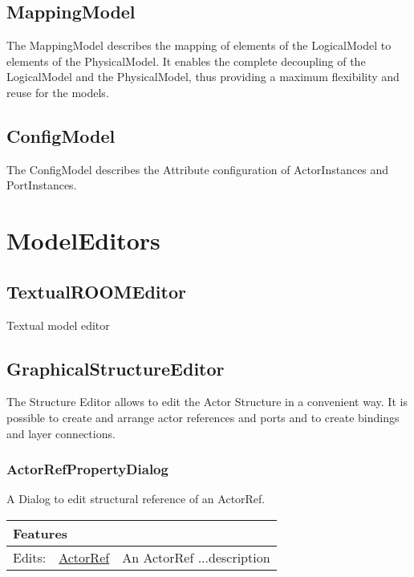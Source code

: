 		
		\subsection{MappingModel}
		The MappingModel describes the mapping of elements of the LogicalModel to elements of the PhysicalModel. It enables the complete decoupling of the LogicalModel and the PhysicalModel, thus providing a maximum flexibility and reuse for the models.
	
		
		\subsection{ConfigModel}
		The ConfigModel describes the Attribute configuration of ActorInstances and PortInstances. 
	
		
\section{ModelEditors}
	
		\subsection{TextualROOMEditor}
		Textual model editor
	
		
		\subsection{GraphicalStructureEditor}
		The Structure Editor allows to edit the Actor Structure in a convenient way. It is possible to create and arrange actor references and ports and to create bindings and layer connections.
	
		
		
		\subsubsection{ActorRefPropertyDialog}
			\hypertarget{ref:ActorRefPropertyDialog}{}
			
			A Dialog to edit structural reference of an ActorRef.
			
			
			\vspace{\baselineskip}
			\begingroup
			\renewcommand{\arraystretch}{1.8} %
			\parbox{\textwidth}{
			\begin{longtable}{l l p{}}
				\multicolumn{2}{l}{\textbf{\large Features}} & \\
				\hline
			Edits: & \tabitem \hyperlink{ref:ActorRef}{ActorRef}  & An ActorRef ...description\\
			\hline
			\end{longtable}	
			}
			\endgroup
			\vspace{\baselineskip}
			
